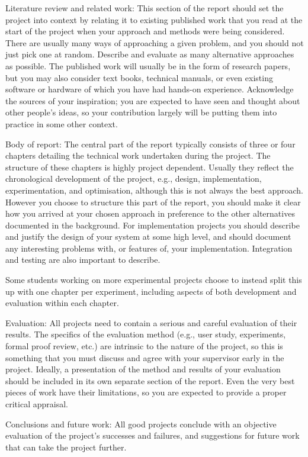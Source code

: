 Literature review and related work: This section of the report should set the project into context by relating it to existing published work that you read at the start of the project when your approach and methods were being considered. There are usually many ways of approaching a given problem, and you should not just pick one at random. Describe and evaluate as many alternative approaches as possible. The published work will usually be in the form of research papers, but you may also consider text books, technical manuals, or even existing software or hardware of which you have had hands-on experience. Acknowledge the sources of your inspiration; you are expected to have seen and thought about other people's ideas, so your contribution largely will be putting them into practice in some other context.

Body of report: The central part of the report typically consists of three or four chapters detailing the technical work undertaken during the project. The structure of these chapters is highly project dependent. Usually they reflect the chronological development of the project, e.g., design, implementation, experimentation, and optimisation, although this is not always the best approach. However you choose to structure this part of the report, you should make it clear how you arrived at your chosen approach in preference to the other alternatives documented in the background. For implementation projects you should describe and justify the design of your system at some high level, and should document any interesting problems with, or features of, your implementation. Integration and testing are also important to describe.

Some students working on more experimental projects choose to instead split this up with one chapter per experiment, including aspects of both development and evaluation within each chapter.

Evaluation: All projects need to contain a serious and careful evaluation of their results. The specifics of the evaluation method (e.g., user study, experiments, formal proof review, etc.) are intrinsic to the nature of the project, so this is something that you must discuss and agree with your supervisor early in the project. Ideally, a presentation of the method and results of your evaluation should be included in its own separate section of the report. Even the very best pieces of work have their limitations, so you are expected to provide a proper critical appraisal.

Conclusions and future work: All good projects conclude with an objective evaluation of the project's successes and failures, and suggestions for future work that can take the project further. 

